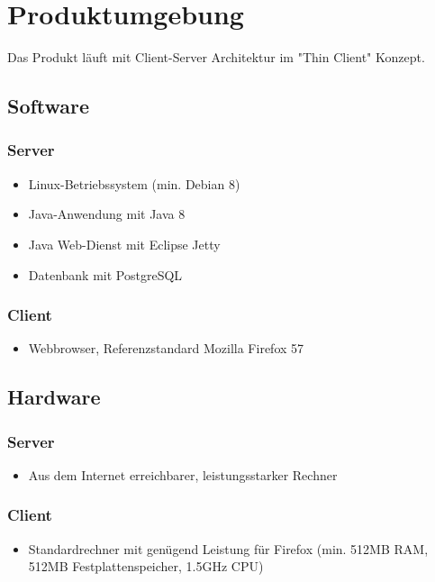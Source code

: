 \chapter{Produktumgebung}
Das Produkt läuft mit Client-Server Architektur im "Thin Client" Konzept.
\section{Software}
\subsection{Server}
\begin{itemize}
	\item Linux-Betriebssystem (min. Debian 8)
	\item Java-Anwendung mit Java 8
	\item Java Web-Dienst mit Eclipse Jetty
	\item Datenbank mit PostgreSQL
\end{itemize}
\subsection{Client}
\begin{itemize}
	\item Webbrowser, Referenzstandard Mozilla Firefox 57
\end{itemize}
\section{Hardware}
\subsection{Server}
\begin{itemize}
	\item Aus dem Internet erreichbarer, leistungsstarker Rechner
\end{itemize}
\subsection{Client}
\begin{itemize}
	\item Standardrechner mit genügend Leistung für Firefox (min. 512MB RAM, 512MB Festplattenspeicher, 1.5GHz CPU)
\end{itemize}